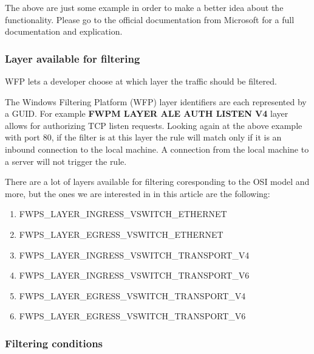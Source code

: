 The above are just some example in order to make a better idea about the functionality. Please go to the official documentation from Microsoft for a full documentation and explication.

\vspace{5mm}
\subsubsection{Layer available for filtering}
\vspace{5mm}

WFP lets a developer choose at which layer the traffic should be filtered.

\vspace{5mm}

The Windows Filtering Platform (WFP) layer identifiers are each represented by a GUID.
For example \textbf{FWPM LAYER ALE AUTH LISTEN V4} layer allows for authorizing TCP listen requests. Looking again at the above example with port 80, if the filter is at this layer the rule will match only if it is an inbound connection to the local machine. A connection from the local machine to a server will not trigger the rule. 

\vspace{5mm}

There are a lot of layers available for filtering coresponding to the OSI model and more, but the ones we are interested in in this article are the following: 

\vspace{5mm}
\begin{enumerate}
\item FWPS\_LAYER\_INGRESS\_VSWITCH\_ETHERNET
\item FWPS\_LAYER\_EGRESS\_VSWITCH\_ETHERNET
\item FWPS\_LAYER\_INGRESS\_VSWITCH\_TRANSPORT\_V4
\item FWPS\_LAYER\_INGRESS\_VSWITCH\_TRANSPORT\_V6
\item FWPS\_LAYER\_EGRESS\_VSWITCH\_TRANSPORT\_V4
\item FWPS\_LAYER\_EGRESS\_VSWITCH\_TRANSPORT\_V6
\end{enumerate}
\vspace{5mm}

\subsubsection{Filtering conditions}
\vspace{5mm}

